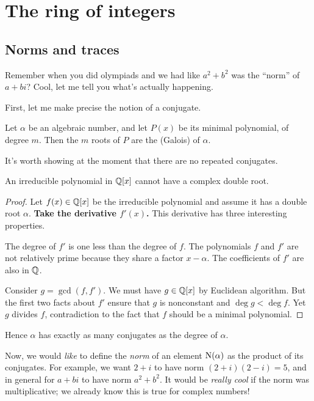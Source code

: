 \chapter{The ring of integers}
\section{Norms and traces}
Remember when you did olympiads and we had like $a^2+b^2$ was the ``norm'' of $a+bi$?
Cool, let me tell you what's actually happening.

First, let me make precise the notion of a conjugate.
\begin{definition}
	Let $\alpha$ be an algebraic number, and let $P(x)$ be its minimal polynomial,
	of degree $m$.
	Then the $m$ roots of $P$ are the (Galois)  of $\alpha$.
\end{definition}
It's worth showing at the moment that there are no repeated conjugates.
\begin{lemma}
	An irreducible polynomial in $\mathbb Q[x]$ cannot have a complex double root.
	\label{lem:irred_complex}
\end{lemma}
\begin{proof}
	Let $f(x) \in \mathbb Q[x]$ be the irreducible polynomial and assume it has a double root $\alpha$.
	\textbf{Take the derivative $f'(x)$.}
	This derivative has three interesting properties.
	\begin{itemize}
		\ii The degree of $f'$ is one less than the degree of $f$.
		\ii The polynomials $f$ and $f'$ are not relatively prime
		because they share a factor $x-\alpha$.
		\ii The coefficients of $f'$ are also in $\mathbb Q$.
	\end{itemize}
	Consider $g = \gcd(f, f')$. We must have $g \in \mathbb Q[x]$ by Euclidean algorithm.
	But the first two facts about $f'$ ensure that $g$ is nonconstant
	and $\deg g < \deg f$.
	Yet $g$ divides $f$,
	contradiction to the fact that $f$ should be a minimal polynomial.
\end{proof}
Hence $\alpha$ has exactly as many conjugates as the degree of $\alpha$.

Now, we would \emph{like} to define the \emph{norm} of an element $\operatorname{N}(\alpha)$
as the product of its conjugates.
For example, we want $2+i$ to have norm $(2+i)(2-i) = 5$,
and in general for $a+bi$ to have norm $a^2+b^2$.
It would be \emph{really cool} if the norm was multiplicative;
we already know this is true for complex numbers!

